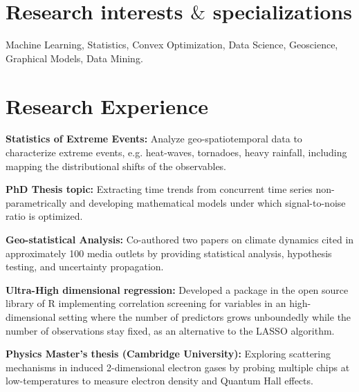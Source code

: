 \documentclass[letterpaper, 12pt]{article}
\renewenvironment{itemize}{
  \begin{list}{}{
    \setlength{\leftmargin}{1.5em}
  }
}{
  \end{list}
}
\begin{document}
\section*{Research interests $\&$ specializations}
\begin{itemize}
\item Machine Learning, Statistics, Convex Optimization, Data Science, Geoscience, Graphical Models, Data
Mining.
\end{itemize}
\section*{Research Experience}

\begin{itemize}
  \item \textbf{Statistics of Extreme Events:}
    \subitem Analyze geo-spatiotemporal data to characterize extreme events, e.g. heat-waves, tornadoes, heavy rainfall, including mapping the distributional shifts of the observables. 
  \item \textbf{PhD Thesis topic:}
    \subitem Extracting time trends from concurrent
                time series non-parametrically and developing
                mathematical models under which signal-to-noise ratio
                is optimized.
        \item \textbf{Geo-statistical Analysis:}
    \subitem Co-authored two papers on climate dynamics cited
                in approximately 100 media outlets by providing statistical
                analysis, hypothesis testing, and uncertainty propagation.
  \item \textbf{Ultra-High dimensional regression:}
          \subitem Developed a package in the open source
          library of R implementing correlation screening for variables
          in an high-dimensional setting where the number of
          predictors grows unboundedly while the number of
          observations stay fixed, as an alternative to the LASSO
          algorithm.
        \item \textbf{Physics Master's thesis (Cambridge University):}
    \subitem Exploring scattering mechanisms in induced
                2-dimensional electron gases by probing multiple chips
                at low-temperatures to measure electron density and
                Quantum Hall effects.

\end{itemize}

\nopagebreak
\end{document}
